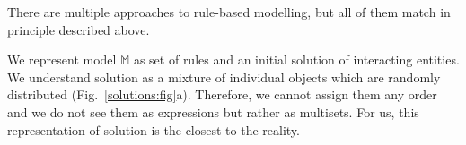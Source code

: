 \documentclass[12pt]{fithesis2}
\begin{document}
There are multiple approaches to rule-based modelling, but all of them match in principle described above. 

We represent model $\mathds{M}$ as set of rules and an initial solution of interacting entities. We understand solution as a mixture of individual objects which are randomly distributed (Fig.~\ref{solutions:fig}a). Therefore, we cannot assign them any order and we do not see them as expressions but rather as multisets. For us, this representation of solution is the closest to the reality.

\begin{figure}[!h]
\begin{center}
\hspace*{1cm}

\end{center}
\end{figure}
\end{document}
